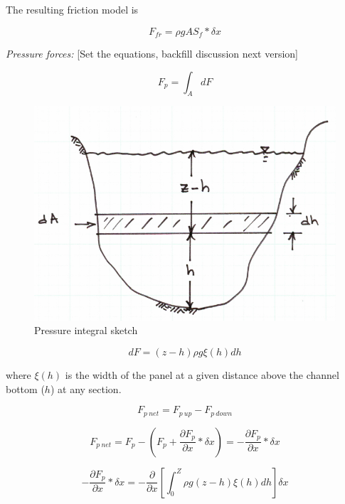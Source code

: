 The resulting friction model is

\begin{equation}
F_{fr} =  \rho g A S_f * \delta x
\end{equation}


\textsl{Pressure forces:}   
[Set the equations, backfill discussion next version]

\begin{equation}
F_p = \int_{A} {dF}
\end{equation}

\begin{figure}[h!] %
   \centering
   \includegraphics[width=5in]{./12-OpenChannelFlow/pressure_sketch.jpg} 
   \caption{Pressure integral sketch}
   \label{fig:pressure_sketch}
\end{figure}

\begin{equation}
dF = (z-h)\rho g \xi (h) dh
\end{equation}

where $\xi (h)$ is the width of the panel at a given distance above the channel bottom ($h$) at any section.

\begin{equation}
F_{p~net} = F_{p~up} - F_{p~down}
\end{equation}

\begin{equation}
F_{p~net} = F_p -( F_p + \frac{\partial F_p}{\partial x}*\delta x) = - \frac{\partial F_p}{\partial x}*\delta x
\end{equation}

\begin{equation}
 - \frac{\partial F_p}{\partial x}*\delta x = -\frac{\partial}{\partial x}[\int_{0}^{Z}\rho g (z-h) \xi(h) dh ] \delta x
\end{equation}

